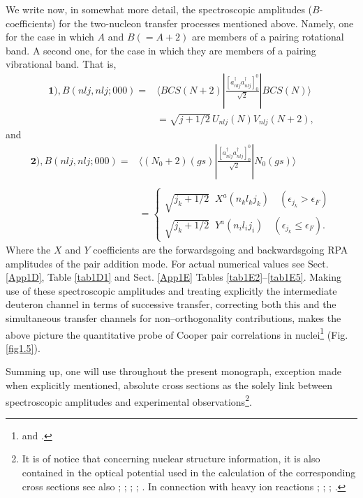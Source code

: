 We write now, in somewhat more detail, the spectroscopic amplitudes ($B$-coefficients) for the two-nucleon transfer processes mentioned above. Namely, one for the case in which $A$ and $B(=A+2)$ are members of a pairing rotational band. A second one, for the case in which they are members of a pairing vibrational band. That is, 
\begin{equation}\label{eqC21.8}
\begin{split}
\mathbf{1)}, B(nlj,nlj;000)=&\langle BCS(N+2)|\frac{[a^\dagger_{nlj}a^\dagger_{nlj}]^0_0}{\sqrt{2}}|BCS(N)\rangle\\
&=\sqrt{j+1/2}\,U_{nlj}(N)V_{nlj}(N+2),
\end{split}
\end{equation}
and
\begin{equation}
\begin{split}
\mathbf{2)}, B(nlj,nlj;000)=&\langle (N_0+2)(gs)|\frac{[a^\dagger_{nlj}a^\dagger_{nlj}]^0_0}{\sqrt{2}}|N_0(gs)\rangle \\
&\\
&=\left\{\begin{array}{c}
\sqrt{j_k+1/2}\;\;X^a(n_kl_kj_k)\quad (\epsilon_{j_k}>\epsilon_F) \\ 
\sqrt{j_k+1/2}\;\;Y^a(n_il_ij_i)\quad (\epsilon_{j_k}\leq\epsilon_F).
\end{array} \right.
\end{split}
\end{equation}
Where the $X$ and $Y$ coefficients are the forwardsgoing and backwardsgoing RPA amplitudes of the pair addition mode.
For actual numerical values see Sect. \ref{App1D}, Table \ref{tab1D1} and Sect. \ref{App1E} Tables \ref{tab1E2}--\ref{tab1E5}. Making use of these spectroscopic amplitudes and treating explicitly the intermediate deuteron channel in terms of successive transfer, correcting both this and the simultaneous transfer channels for non--orthogonality contributions, makes the above picture the quantitative probe of Cooper pair correlations in nuclei\footnote{\cite{Bayman:82} and \cite{Potel:13}.}  (Fig. \ref{fig1.5}).

Summing up, one will use throughout the present monograph, exception made when explicitly mentioned, absolute cross sections as the solely link between spectroscopic amplitudes and experimental observations\footnote{It is of notice that concerning nuclear structure information, it is also contained in the optical potential used in the calculation of the corresponding cross sections see also  \cite{Fernandez:10}; \cite{Fernandez:10b}; \cite{Dickhoff:05}; \cite{Jenning:11};  \cite{Barbieri:05,Dickhoff:17,Rotureau:17}. In connection with heavy ion reactions  \cite{Broglia:81b}; \cite{Pollarolo:83}; \cite{Broglia:04a}; \cite{Montanari:14}.}.

